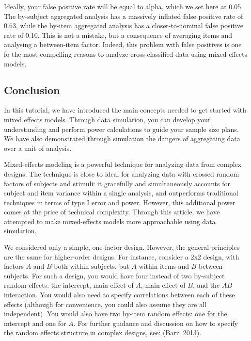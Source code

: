 \documentclass[man,floatsintext]{apa6}
\begin{document}
Ideally, your false positive rate will be equal to alpha, which we set here at 0.05. The by-subject aggregated analysis has a massively inflated false positive rate of 0.63, while the by-item aggregated analysis has a closer-to-nominal false positive rate of 0.10. This is not a mistake, but a consequence of averaging items and analysing a between-item factor. Indeed, this problem with false positives is one fo the most compelling reasons to analyze cross-classified data using mixed effects models.

\hypertarget{conclusion}{%
\subsection{Conclusion}\label{conclusion}}

In this tutorial, we have introduced the main concepts needed to get started with mixed effects models. Through data simulation, you can develop your understanding and perform power calculations to guide your sample size plans. We have also demonstrated through simulation the dangers of aggregating data over a unit of analysis.

Mixed-effects modeling is a powerful technique for analyzing data from complex designs. The technique is close to ideal for analyzing data with crossed random factors of subjects and stimuli: it gracefully and simultaneously accounts for subject and item variance within a single analysis, and outperforms traditional techniques in terms of type I error and power. However, this additional power comes at the price of technical complexity. Through this article, we have attempted to make mixed-effects models more approachable using data simulation.

We considered only a simple, one-factor design. However, the general principles are the same for higher-order designs. For instance, consider a 2x2 design, with factors \(A\) and \(B\) both within-subjects, but \(A\) within-items and \(B\) between subjects. For such a design, you would have four instead of two by-subject random effects: the intercept, main effect of \(A\), main effect of \(B\), and the \(AB\) interaction. You would also need to specify correlations between each of these effects (although for convenience, you could also assume they are all independent). You would also have two by-item random effects: one for the intercept and one for \(A\). For further guidance and discussion on how to specify the random effects structure in complex designs, see: (Barr, 2013).
\end{document}
